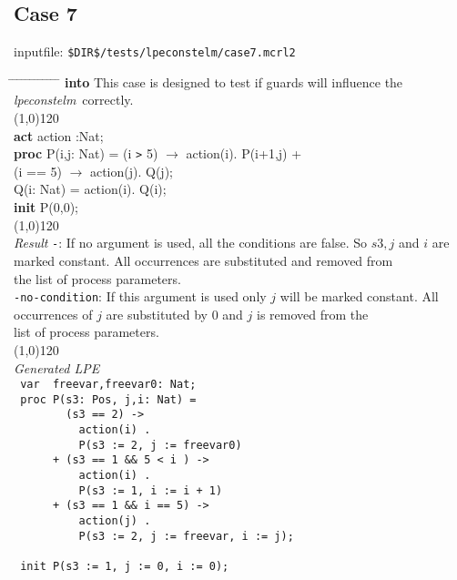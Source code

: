 \index{}\documentclass[a4paper,10pt]{article}
\theoremstyle{plain}
\theoremstyle{definition}
\newcommand{\tool}{\textit{lpeconstelm}}
\newcommand{\pps}{process parameters}
\newcommand{\ti}{\textit}
\newcommand{\tb}{\textbf}
\newcommand{\tabw}{\hspace*{15.mm} \= \hspace*{20.mm} \= \hspace*{5.mm} \= \hspace*{5.mm} \= \hspace*{5.mm} \= \hspace*{5.mm}  \= \hspace*{5.mm}  \= \hspace*{5.mm}  \= \hspace*{5.mm} \= \hspace*{5.mm} \= \hspace*{5.mm}  \= \hspace*{5.mm}  \= \hspace*{5.mm}\kill}
\begin{document}
\subsection*{Case 7}
inputfile: \verb"$DIR$/tests/lpeconstelm/case7.mcrl2"
\begin{tabbing}
\tabw
\tb{into} \> This case is designed to test if guards will influence the \tool\ correctly.\\
\line(1,0){120}\\
\tb{act}  \> action :Nat;\\
\tb{proc} \> P(i,j: Nat) =  \>  (i \verb">" 5) $\rightarrow$ action(i). P(i+1,j) +\\
          \>                \> (i == 5)        $\rightarrow$ action(j). Q(j);\\
          \> Q(i: Nat)   = \>                                action(i). Q(i);\\

\tb{init} \>  P(0,0);\\
\line(1,0){120}\\
\ti{Result} \> \verb"-": \> \> If no argument is used, all the conditions are false. So $s3, j$ and $i$ are \\
\> \> \>  marked constant. All occurrences are substituted and removed from \\
\> \> \> the list of \pps .\\
\> \verb"-no-condition": \> \> If this argument is used only $j$ will be marked constant. All \\ 
\> \> \> occurrences of $j$ are substituted by 0 and $j$ is removed from the \\
\> \> \> list of \pps .\\
\line(1,0){120}\\
\ti{Generated LPE} \\
\>  \verb" var  freevar,freevar0: Nat;"\\                            
\>  \verb" proc P(s3: Pos, j,i: Nat) = "\\                           
\>  \verb"        (s3 == 2) ->          "\\                          
\>  \verb"          action(i) .          "\\                         
\>  \verb"          P(s3 := 2, j := freevar0)"\\                     
\>  \verb"      + (s3 == 1 && 5 < i ) ->      "\\                    
\>  \verb"          action(i) .               "\\                    
\>  \verb"          P(s3 := 1, i := i + 1)  "\\                      
\>  \verb"      + (s3 == 1 && i == 5) ->   "\\                       
\>  \verb"          action(j) .          "\\                         
\>  \verb"          P(s3 := 2, j := freevar, i := j);"\\             
\>  \verb"                 "\\                                       
\>  \verb" init P(s3 := 1, j := 0, i := 0);"\\  
\end{tabbing}
\newpage
\end{document}
